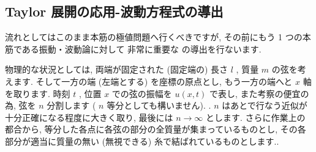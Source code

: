 \documentclass[openany, a4paper, oneside]{jsbook}
\theoremstyle{break}
\theoremstyle{breakdefn}
\begin{document}
\subsection{Taylor 展開の応用-波動方程式の導出}


流れとしてはこのまま本筋の極値問題へ行くべきですが, その前にもう 1 つの本筋である振動・波動論に対して
非常に重要な
の導出を行ないます.

物理的な状況としては, 両端が固定された (固定端の) 長さ $l$ , 質量 $m$ の弦を考えます.
そして一方の端 (左端とする) を座標の原点とし, もう一方の端へと $x$ 軸を取ります.
時刻 $t$ , 位置 $x$ での弦の振幅を $u (x,t)$ で表し,
また考察の便宜の為, 弦を $n$ 分割します ( $n$ 等分としても構いません). .
$n$ はあとで行なう近似が十分正確になる程度に大きく取り, 最後には $n \to \infty$ とします.
さらに作業上の都合から, 等分した各点に各弦の部分の全質量が集まっているものとし,
その各部分が適当に質量の無い (無視できる) 糸で結ばれているものとします..
\end{document}
